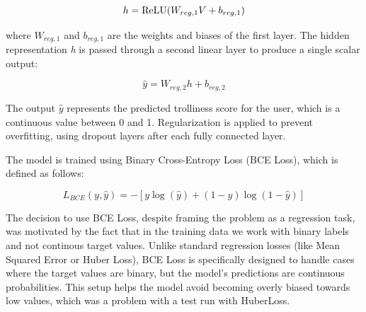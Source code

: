 \documentclass[twoside]{ctuthesis}
\theoremstyle{plain}
\theoremstyle{definition}
\theoremstyle{note}
\begin{document}
\begin{equation}
	h = \mathrm{ReLU}(W_{reg,1} V + b_{reg,1}) \\
\end{equation}

where $W_{reg,1}$ and $b_{reg,1}$ are the weights and biases of the first layer. The hidden representation \textit{h} is passed through a second linear layer to produce a single scalar output:

\begin{equation}
	\hat{y} = W_{reg,2} h + b_{reg,2}
\end{equation}

The output $\hat{y}$ represents the predicted trolliness score for the user, which is a continuous value between 0 and 1. Regularization is applied to prevent overfitting, using dropout layers after each fully connected layer.\par

The model is trained using Binary Cross-Entropy Loss (BCE Loss), which is defined as follows:

\begin{equation}
	L_{BCE}(y, \hat{y}) = - \left[ y \log(\hat{y}) + (1 - y) \log(1 - \hat{y}) \right]
\end{equation}

The decision to use BCE Loss, despite framing the problem as a regression task, was motivated by the fact that in the training data we work with binary labels and not continous target values. Unlike standard regression losses (like Mean Squared Error or Huber Loss), BCE Loss is specifically designed to handle cases where the target values are binary, but the model's predictions are continuous probabilities. This setup helps the model avoid becoming overly biased towards low values, which was a problem with a test run with HuberLoss.\par 
\end{document}
